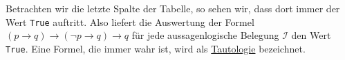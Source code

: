\begin{table}[!ht]
  \centering
{}
  \caption{Berechnung der Wahrheitswerte von $(p \rightarrow q) \rightarrow (\neg p \rightarrow q) \rightarrow q$}
  \label{tab:tautologie}
\end{table}

Betrachten wir die letzte Spalte der Tabelle, so sehen wir, dass dort immer der Wert
\texttt{True} auftritt.  Also liefert die Auswertung der Formel
$(p \rightarrow q) \rightarrow (\neg p \rightarrow q) \rightarrow q $
für jede aussagenlogische Belegung $\mathcal{I}$ den Wert \texttt{True}.  
Eine Formel, die immer wahr ist, wird als \href{https://en.wikipedia.org/wiki/Tautology_(logic)}{Tautologie} bezeichnet.

